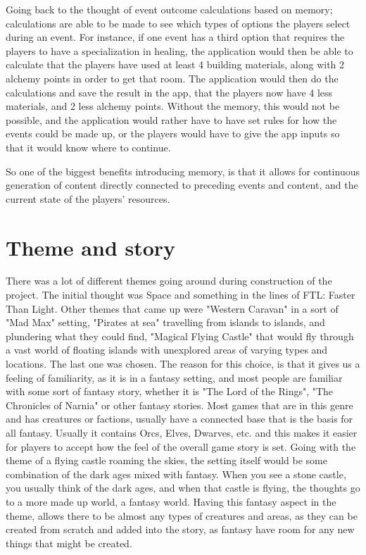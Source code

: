 Going back to the thought of event outcome calculations based on memory; calculations are able to be made to see which types of options 
the players select during an event. For instance, if one event has a third option that requires the players to have a specialization in 
healing, the application would then be able to calculate that the players have used at least 4 building materials, 
along with 2 alchemy points in order to get that room. The application would then do the calculations and save the result 
in the app, that the players now have 4 less materials, and 2 less alchemy points. Without the memory, this would not be 
possible, and the application would rather have to have set rules for how the events could be made up, or the players 
would have to give the app inputs so that it would know where to continue.

So one of the biggest benefits introducing memory, is that it allows for continuous generation of content directly connected to 
preceding events and content, and the current state of the players' resources.
\section{Theme and story}
There was a lot of different themes going around during construction of the project.
 The initial thought was Space and something in the lines of FTL: Faster Than Light. 
 Other themes that came up were "Western Caravan" in a sort of "Mad Max" setting, "Pirates at sea" travelling 
 from islands to islands, and plundering what they could find, "Magical Flying Castle" that would fly through a 
 vast world of floating islands with unexplored areas of varying types and locations. The last one was chosen. 
 The reason for this choice, is that it gives us a feeling of familiarity, as it is in a fantasy setting,
 and most people are familiar with some sort of fantasy story, whether it is "The Lord of the Rings", 
 "The Chronicles of Narnia" or other fantasy stories. Most games that are in this genre and has creatures or factions, 
 usually have a connected base that is the basis for all fantasy. Usually it contains Orcs, Elves, Dwarves, etc. 
 and this makes it easier for players to accept how the feel of the overall game story is set. 
 Going with the theme of a flying castle roaming the skies, the setting itself would be some combination of the dark ages mixed with fantasy.
 When you see a stone castle, you usually think of the dark ages, and when that castle is flying, the thoughts go to a more made up world,
 a fantasy world. Having this fantasy aspect in the theme, allows there to be almost any types of creatures and areas,
 as they can be created from scratch and added into the story, as fantasy have room for any new things that might be created.
 
